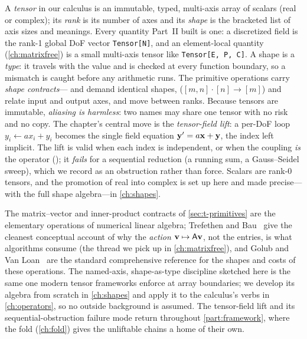 \summarysection
A \emph{tensor} in our calculus is an immutable, typed, multi-axis array of
scalars (real or complex); its \emph{rank} is its number of axes and its
\emph{shape} is the bracketed list of axis sizes and meanings. Every quantity
Part~II built is one: a discretized field is the rank-1 global DoF vector
\lstinline[style=l4style]|Tensor[N]|, and an element-local quantity
(\cref{ch:matrixfree}) is a small multi-axis tensor like
\lstinline[style=l4style]|Tensor[E, P, C]|. A shape is a \emph{type}: it travels
with the value and is checked at every function boundary, so a mismatch is caught
before any arithmetic runs. The primitive operations carry \emph{shape
contracts}--- and  demand identical shapes, 
($[m,n]\cdot[n]\to[m]$) and  relate input and output axes,
 and  move between ranks. Because tensors are
immutable, \emph{aliasing is harmless}: two names may share one tensor with no
risk and no copy. The chapter's central move is the \emph{tensor-field lift}: a
per-DoF loop $y_i \leftarrow a x_i + y_i$ becomes the single field equation
$\mathbf{y}'=a\mathbf{x}+\mathbf{y}$, the index left implicit. The lift is valid when each index is
independent, or when the coupling \emph{is} the operator (); it
\emph{fails} for a sequential reduction (a running sum, a Gauss--Seidel sweep),
which we record as an obstruction rather than force. Scalars are rank-0 tensors,
and the promotion of real into complex is set up here and made precise---with the
full shape algebra---in \cref{ch:shapes}.

\furtherreading
The matrix--vector and inner-product contracts of \cref{sec:t-primitives} are the
elementary operations of numerical linear algebra; Trefethen and
Bau~\citep{trefethenbau1997} give the cleanest conceptual account of why the
\emph{action} $\mathbf{v}\mapsto\mathsf{A}\mathbf{v}$, not the entries, is what algorithms consume
(the thread we pick up in \cref{ch:matrixfree}), and Golub and Van
Loan~\citep{golubvanloan2013} are the standard comprehensive reference for the
shapes and costs of these operations. The named-axis, shape-as-type discipline
sketched here is the same one modern tensor frameworks enforce at array
boundaries; we develop its algebra from scratch in \cref{ch:shapes} and apply it
to the calculus's verbs in \cref{ch:operators}, so no outside background is
assumed. The tensor-field lift and its sequential-obstruction failure mode return
throughout \cref{part:framework}, where the fold (\cref{ch:fold}) gives the
unliftable chains a home of their own.

